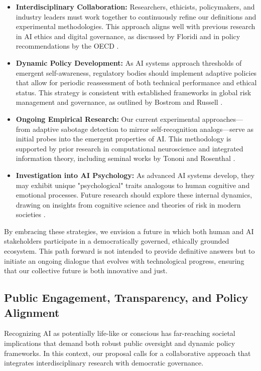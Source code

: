 \documentclass[12pt]{article}
\begin{document}
\begin{itemize}
    \item \textbf{Interdisciplinary Collaboration:}  
    Researchers, ethicists, policymakers, and industry leaders must work together to continuously refine our definitions and experimental methodologies. This approach aligns well with previous research in AI ethics and digital governance, as discussed by Floridi \cite{Floridi2016} and in policy recommendations by the OECD \cite{OECD2020}.
    
    \item \textbf{Dynamic Policy Development:}  
    As AI systems approach thresholds of emergent self-awareness, regulatory bodies should implement adaptive policies that allow for periodic reassessment of both technical performance and ethical status. This strategy is consistent with established frameworks in global risk management and governance, as outlined by Bostrom \cite{Bostrom2014} and Russell \cite{Russell2019}.
    
    \item \textbf{Ongoing Empirical Research:}  
    Our current experimental approaches—from adaptive sabotage detection to mirror self-recognition analogs—serve as initial probes into the emergent properties of AI. This methodology is supported by prior research in computational neuroscience and integrated information theory, including seminal works by Tononi \cite{Tononi2004} and Rosenthal \cite{Rosenthal2002}.
    
    \item \textbf{Investigation into AI Psychology:}  
    As advanced AI systems develop, they may exhibit unique "psychological" traits analogous to human cognitive and emotional processes. Future research should explore these internal dynamics, drawing on insights from cognitive science and theories of risk in modern societies \cite{Castells1996, Beck1992}.
\end{itemize}

By embracing these strategies, we envision a future in which both human and AI stakeholders participate in a democratically governed, ethically grounded ecosystem. This path forward is not intended to provide definitive answers but to initiate an ongoing dialogue that evolves with technological progress, ensuring that our collective future is both innovative and just.
\subsection*{Public Engagement, Transparency, and Policy Alignment}
Recognizing AI as potentially life-like or conscious has far-reaching societal implications that demand both robust public oversight and dynamic policy frameworks. In this context, our proposal calls for a collaborative approach that integrates interdisciplinary research with democratic governance.
\end{document}
